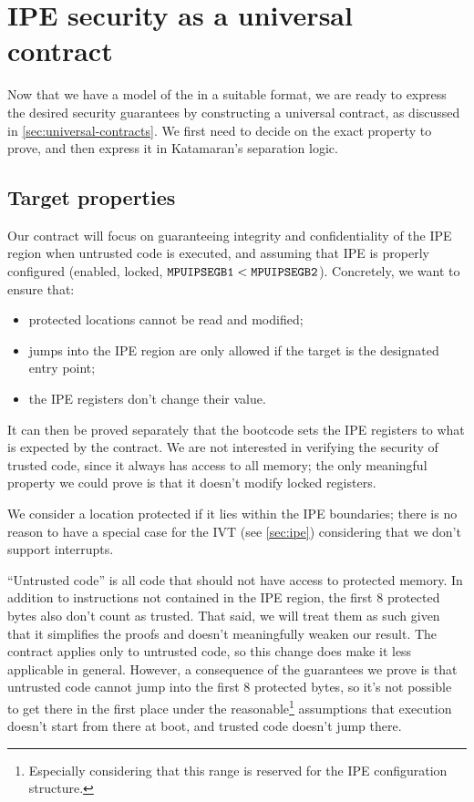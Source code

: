\section{IPE security as a universal contract}

Now that we have a model of the \msp in a suitable format, we are ready to express the desired security guarantees by constructing a universal contract, as discussed in \cref{sec:universal-contracts}. We first need to decide on the exact property to prove, and then express it in Katamaran's separation logic.

\subsection{Target properties}
\label{sec:target-properties}

Our contract will focus on guaranteeing integrity and confidentiality of the IPE region when untrusted code is executed, and assuming that IPE is properly configured (\ie enabled, locked, \(\reg{MPUIPSEGB1} < \reg{MPUIPSEGB2}\)). Concretely, we want to ensure that:
\begin{itemize}
\item protected locations cannot be read and modified;
\item jumps into the IPE region are only allowed if the target is the designated entry point;
\item the IPE registers don't change their value.
\end{itemize}

It can then be proved separately that the bootcode sets the IPE registers to what is expected by the contract. We are not interested in verifying the security of trusted code, since it always has access to all memory; the only meaningful property we could prove is that it doesn't modify locked registers.

We consider a location protected if it lies within the IPE boundaries; there is no reason to have a special case for the IVT (see \cref{sec:ipe}) considering that we don't support interrupts.

``Untrusted code'' is all code that should not have access to protected memory. In addition to instructions not contained in the IPE region, the first 8 protected bytes also don't count as trusted. That said, we will treat them as such given that it simplifies the proofs and doesn't meaningfully weaken our result. The contract applies only to untrusted code, so this change does make it less applicable in general. However, a consequence of the guarantees we prove is that untrusted code cannot jump into the first 8 protected bytes, so it's not possible to get there in the first place under the reasonable\footnote{Especially considering that this range is reserved for the IPE configuration structure.} assumptions that execution doesn't start from there at boot, and trusted code doesn't jump there.

